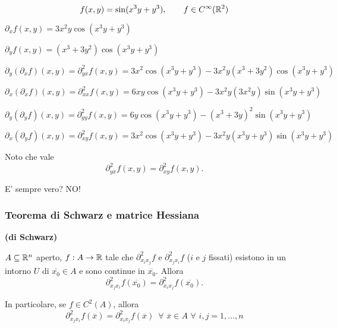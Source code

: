 \newpage %
\begin{exbar}
	$$f(x,y)=\sin(x^3y+y^3), \qquad f \in C^\infty(\mathbb{R}^2)$$
	
	$\partial_xf(x,y)=3x^2y \cos(x^3y+y^3)$
	
	$\partial_y f(x,y)=(x^3+3y^2)\cos(x^3y+y^3)$
	
	$\partial_y(\partial_xf)(x,y)=\partial_{yx}^2f(x,y)=3x^2 \cos(x^3y+y^3)-3x^2y(x^3+3y^2)\cos(x^3y+y^3)$
	
	$\partial_x(\partial_x f)(x,y)= \partial_{xx}^2f(x,y)=6xy\cos(x^3y+y^3)-3x^2y(3x^2y)\sin(x^3y+y^3)$
	
	$\partial_y(\partial_y f)(x,y)=\partial_{yy}^2f(x,y)=6y\cos(x^3y+y^3)-(x^3+3y)^2\sin(x^3y+y^3)$
	
	$\partial_x(\partial_y f)(x,y)=\partial_{xy}^2f(x,y)=3x^2\cos(x^3y+y^3)-3x^2y(x^3y+y^3)\sin(x^3y+y^3)$
	
	Noto che vale
	\begin{equation*}
		\partial_{yx}^2f(x,y)=\partial_{xy}^2f(x,y).
	\end{equation*}
	
	E' sempre vero? NO!
\end{exbar}


\subsubsection{Teorema di Schwarz e matrice Hessiana}
\begin{theorem} \textbf{(di Schwarz)}
	
	$A \subseteq\mathbb{R}^n$ aperto, $f:A\rightarrow\mathbb{R}$ tale che $\partial_{x_ix_j}^2f$ e $\partial_{x_jx_i}^2f$ ($i$ e $j$ fissati) esistono in un intorno $U$ di $\overline{x_0}\in A$ e sono continue in $\overline{x_0}$. Allora
	\begin{equation*}
		\partial_{x_jx_i}^2f(\overline{x_0})=\partial_{x_ix_j}^2f(\overline{x_0}).
	\end{equation*}
	
	In particolare, se $f \in C^2(A)$, allora 
	\begin{equation*}
		\partial_{x_jx_i}^2f(\overline{x})=\partial_{x_ix_j}^2f(\overline{x})\,\,\, \forall\,\, \overline{x} \in A\,\, \forall \,\,i,j=1,...,n 
	\end{equation*}  
\end{theorem}


